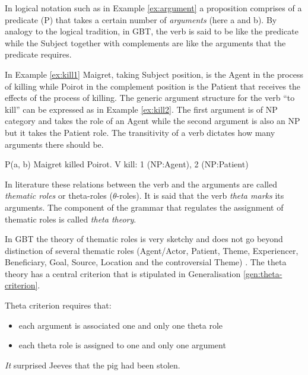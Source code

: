 In logical notation such as in Example \ref{ex:argument} a proposition comprises of a predicate (P) that takes a certain number of \textit{arguments} (here a and b). By analogy to the logical tradition, in GBT, the verb is said to be like the predicate while the Subject together with complements are like the arguments that the predicate requires. 

In Example \ref{ex:kill1} Maigret, taking Subject position, is the Agent in the process of killing while Poirot in the complement position is the Patient that receives the effects of the process of killing. The generic argument structure for the verb ``to kill'' can be expressed as in Example \ref{ex:kill2}. The first argument is of NP category and takes the role of an Agent while the second argument is also an NP but it takes the Patient role. The transitivity of a verb dictates how many arguments there should be.

\begin{exe}
    \ex\label{ex:argument} P(a, b)
    \ex\label{ex:kill1} Maigret killed Poirot.
    \ex\label{ex:kill2} V kill: 1 (NP:Agent), 2 (NP:Patient)
\end{exe}

In literature these relations between the verb and the arguments are called \textit{thematic roles} or theta-roles ($\theta$-roles). It is said that the verb \textit{theta marks} its arguments. The component of the grammar that regulates the assignment of thematic roles is called \textit{theta theory}. 

In GBT the theory of thematic roles is very sketchy and does not go beyond distinction of several thematic roles (Agent/Actor, Patient, Theme, Experiencer, Beneficiary, Goal, Source, Location and the controversial Theme) \citep[50]{Haegeman1991}. The theta theory has a central criterion that is stipulated in Generalisation \ref{gen:theta-criterion}.

\begin{generalization}\label{gen:theta-criterion}
    Theta criterion requires that: 
    \begin{itemize}
        \item each argument is associated one and only one theta role
        \item each theta role is assigned to one and only one argument \citep[54]{Haegeman1991}
    \end{itemize} 
\end{generalization}

\begin{exe}
    \ex\label{ex:expletive1} \textit{It} surprised Jeeves that the pig had been stolen.
\end{exe}

